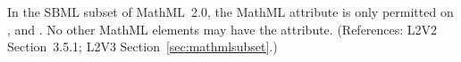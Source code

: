 In the SBML subset of MathML~2.0, the MathML attribute
 is only permitted on ,
 and .  No other
MathML elements may have the  attribute.
(References: L2V2 Section~3.5.1; L2V3 Section~\ref{sec:mathmlsubset}.)
